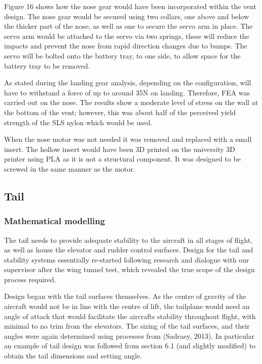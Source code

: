 \documentclass[../../main.tex]{subfiles}
\begin{document}
Figure 16 shows how the nose gear would have been incorporated within the vent design.
The nose gear would be secured using two collars, one above and below the thicker part of the nose, as well as one to secure the servo arm in place.
The servo arm would be attached to the servo via two springs, these will reduce the impacts and prevent the nose from rapid direction changes due to bumps.
The servo will be bolted onto the battery tray, to one side, to allow space for the battery tray to be removed. 

As stated during the landing gear analysis, depending on the configuration, will have to withstand a force of up to around 35N on landing.
Therefore, FEA was carried out on the nose.
The results show a moderate level of stress on the wall at the bottom of the vent; however, this was about half of the perceived yield strength of the SLS nylon which would be used. 


When the nose motor was not needed it was removed and replaced with a small insert.
The hollow insert would have been 3D printed on the university 3D printer using PLA as it is not a structural component.
It was designed to be screwed in the same manner as the motor. 


\subsection{Tail} \label{sec:design-process:final-design-proposal:tail}

\subsubsection{Mathematical modelling} \label{sec:design-process:final-design-proposal:tail:mathematical-modelling}

The tail needs to provide adequate stability to the aircraft in all stages of flight, as well as house the elevator and rudder control surfaces.
Design for the tail and stability systems essentially re-started following research and dialogue with our supervisor after the wing tunnel test, which revealed the true scope of the design process required. 

Design began with the tail surfaces themselves.
As the centre of gravity of the aircraft would not be in line with the centre of lift, the tailplane would need an angle of attack that would facilitate the aircrafts stability throughout flight, with minimal to no trim from the elevators.
The sizing of the tail surfaces, and their angles were again determined using processes from (Sadraey, 2013).
In particular an example of tail design was followed from section 6.1 (and slightly modified) to obtain the tail dimensions and setting angle. 
\end{document}
